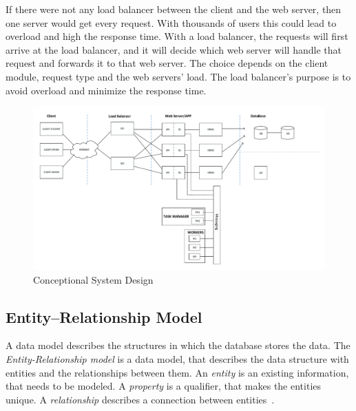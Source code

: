If there were not any load balancer between the client and the web server, then one server would get every request. With thousands of users this could lead to overload and high the response time. With a load balancer, the requests will first arrive at the load balancer, and it will decide which web server will handle that request and forwards it to that web server. The choice depends on the client module, request type and the web servers' load. The load balancer's purpose is to avoid overload and minimize the response time.
 
 \begin{figure}[!htbp]
 	\includegraphics[width=0.95\textheight, angle=90]{figures/atfogo_rendszerterv_teljes.pdf}
 	\caption[Conceptional System Design]{Conceptional System Design}
 	\label{fig:conceptional-system-design}
 \end{figure}
 
 
 
 \newpage
\subsection{Entity–Relationship Model}
\label{ER-model}

A data model describes the structures in which the database stores the data. The \emph{Entity-Relationship model} is a data model, that describes the data structure with entities and the relationships between them. An \emph{entity} is an existing information, that needs to be modeled. A \emph{property} is a qualifier, that makes the entities unique. A \emph{relationship} describes a connection between entities~\cite{adatb}.
 
